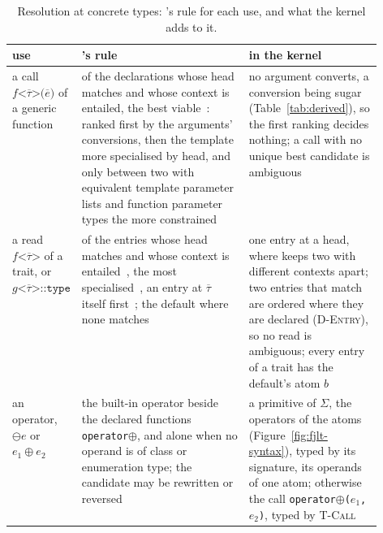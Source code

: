\begin{table}[htbp]
\centering
\small
\begin{tabularx}{\linewidth}{@{}>{\raggedright\arraybackslash}p{0.17\linewidth}>{\raggedright\arraybackslash}X>{\raggedright\arraybackslash}p{0.36\linewidth}@{}}
\toprule
use & \Cpp{}'s rule & in the kernel \\
\midrule
a call $f\texttt{<}\overline{\tau}\texttt{>(}\overline{e}\texttt{)}$ of a generic function & of the declarations whose head matches and whose context is entailed, the best viable~\cite[{\texttt{over.match}}, {\texttt{over.match.best}}]{cpp23standard}: ranked first by the arguments' conversions, then the template more specialised by head, and only between two with equivalent template parameter lists and function parameter types the more constrained~\cite[{\texttt{temp.func.order}}, {\texttt{temp.constr.order}}]{cpp23standard} & no argument converts, a conversion being sugar (Table~\ref{tab:derived}), so the first ranking decides nothing; a call with no unique best candidate is ambiguous \\
a read $f\texttt{<}\overline{\tau}\texttt{>}$ of a trait, or $g\texttt{<}\overline{\tau}\texttt{>::type}$ & of the entries whose head matches and whose context is entailed~\cite[{\texttt{temp.spec.partial.match}}]{cpp23standard}, the most specialised~\cite[{\texttt{temp.spec.partial.order}}]{cpp23standard}, an entry at $\overline{\tau}$ itself first~\cite[{\texttt{temp.expl.spec}}]{cpp23standard}; the default where none matches & one entry at a head, where \Cpp{} keeps two with different contexts apart; two entries that match are ordered where they are declared (\textsc{D-Entry}), so no read is ambiguous; every entry of a trait has the default's atom $b$ \\
an operator, $\ominus e$ or $e_1 \oplus e_2$ & the built-in operator beside the declared functions \texttt{operator}$\oplus$, and alone when no operand is of class or enumeration type; the candidate may be rewritten or reversed~\cite[{\texttt{over.match.oper}}]{cpp23standard} & a primitive of $\Sigma$, the operators of the atoms (Figure~\ref{fig:fjlt-syntax}), typed by its signature, its operands of one atom; otherwise the call \texttt{operator}$\oplus$\texttt{(}$e_1$\texttt{, }$e_2$\texttt{)}, typed by \textsc{T-Call} \\
\bottomrule
\end{tabularx}
\caption{Resolution at concrete types: \Cpp{}'s rule for each use, and what the kernel adds to it.}
\label{tab:resolution}
\end{table}

